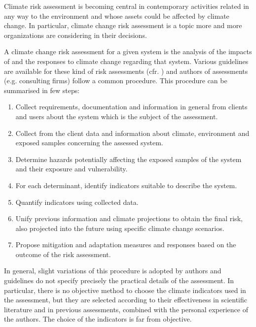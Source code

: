 \documentclass[./main.tex]{subfiles}
\begin{document}
Climate risk assessment is becoming central in contemporary activities related in any way to the environment and whose assets could be affected by climate change.
In particular, climate change risk assessment is a topic more and more organizations are considering in their decisions.

A climate change risk assessment for a given system is the analysis of the impacts of and the responses to climate change regarding that system. Various guidelines are available for these kind of risk assessments (cfr. \cite{2021ISO14091,2024EEAExecutiveSummary,2017GIZTheVulnerability}) and authors of assessments (e.g. consulting firms) follow a common procedure.
This procedure can be summarised in few steps:
\begin{enumerate}
  \item Collect requirements, documentation and information in general from clients and users about the system which is the subject of the assessment.
  \item Collect from the client data and information about climate, environment and exposed samples concerning the assessed system.
  \item Determine hazards potentially affecting the exposed samples of the system and their exposure and vulnerability.
  \item For each determinant, identify indicators suitable to describe the system.
  \item Quantify indicators using collected data.
  \item Unify previous information and climate projections to obtain the final risk, also projected into the future using specific climate change scenarios.
  \item Propose mitigation and adaptation measures and responses based on the outcome of the risk assessment.
\end{enumerate}

In general, slight variations of this procedure is adopted by authors and guidelines do not specify precisely the practical details of the assessment. In particular, there is no objective method to choose the climate indicators used in the assessment, but they are selected according to their effectiveness in scientific literature and in previous assessments, combined with the personal experience of the authors. The choice of the indicators is far from objective.
\end{document}
